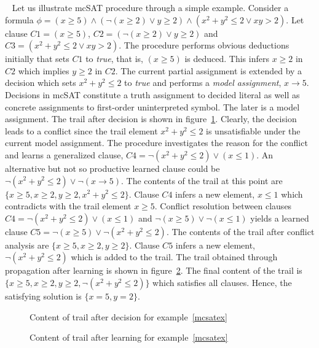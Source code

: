 \begin{example}~\label{mcsatex}
%
Let us illustrate mcSAT procedure through a simple example. Consider a formula 
$\phi = (x \geq 5) \wedge (\neg (x \geq 2) \vee y \geq 2) \wedge (x^2 + y^2 \leq 2 \vee xy > 2)$.  
Let clause $C1 = (x \geq 5)$, $C2 = (\neg (x \geq 2) \vee y \geq 2)$ and 
$C3 = (x^2 + y^2 \leq 2 \vee xy > 2)$.  The procedure performs obvious deductions initially 
that sets $C1$ to \emph{true}, that is, $(x \geq 5)$ is deduced.  This infers $x \geq 2$ 
in $C2$ which implies $y \geq 2$ in $C2$.  The current partial assignment 
is extended by a decision which sets $x^2 + y^2 \leq 2$ to \emph{true} and performs a 
\emph{model assignment}, $x \rightarrow 5$.  Decisions in mcSAT constitute a truth 
assignment to decided literal as well as concrete assignments to first-order uninterpreted 
symbol.  The later is a model assignment.  The trail after decision is shown in figure~\ref{dec}.
Clearly, the decision leads to a conflict since the trail element $x^2 + y^2  \leq 2$ is 
unsatisfiable under the current model assignment.  The procedure investigates the 
reason for the conflict and learns a generalized clause, 
$C4 = \neg (x^2 + y^2 \leq 2) \vee (x \leq 1)$.  An alternative but not so productive 
learned clause could be $\neg(x^2 + y^2 \leq 2) \vee \neg(x \rightarrow 5)$.  
The contents of the trail at this point are $\{x \geq 5, x \geq 2, y \geq 2, x^2+y^2 \leq 2 \}$.  Clause 
$C4$ infers a new element, $x \leq 1$ which contradicts with the trail element $x \geq 5$.  
Conflict resolution between clauses $C4 =  \neg (x^2 + y^2 \leq 2) \vee (x \leq 1)$ and 
$\neg (x \geq 5) \vee \neg (x \leq 1)$ yields a learned clause $C5 = \neg(x \geq 5) \vee \neg(x^2 + y^2 \leq 2)$.  
The contents of the trail after conflict analysis are $\{x \geq 5, x \geq 2, y \geq 2 \}$. Clause $C5$ infers a 
new element, $\neg (x^2 + y^2 \leq 2)$ which is added to the trail.  The trail obtained 
through propagation after learning is shown in figure~\ref{mcfinal}.  The final content of 
the trail is $\{x \geq 5, x \geq 2, y \geq 2, \neg(x^2 + y^2 \leq 2) \}$ which satisfies 
all clauses.  Hence, the satisfying solution is $\{x=5, y=2\}$.
\end{example}
%
\begin{figure}
\centering
{}
  \caption{Content of trail after decision for example~\ref{mcsatex} \label{dec}}
\end{figure} 
%
%
\begin{figure}
\centering
{}
  \caption{Content of trail after learning for example~\ref{mcsatex} \label{mcfinal}}
\end{figure} 
%

